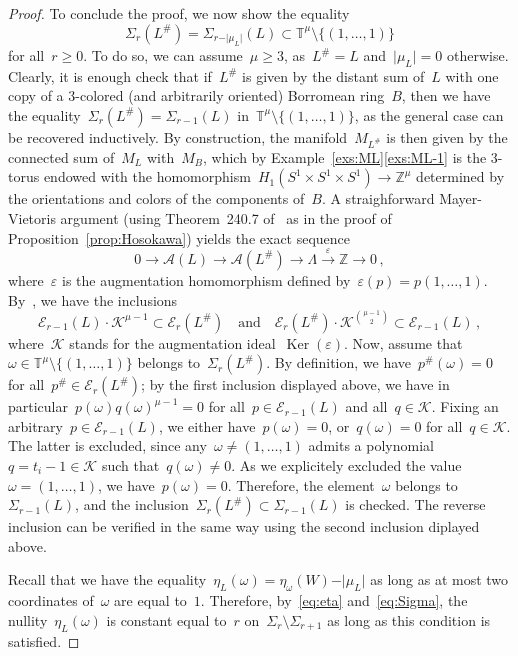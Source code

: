 \documentclass{amsart}
\newcommand{\Z}{\mathbb{Z}}
\newcommand{\K}{\mathcal{K}}
\newcommand{\T}{\mathbb{T}}
\newcommand{\A}{\mathcal{A}}
\newcommand{\Ker}{\operatorname{Ker}}
\theoremstyle{definition}
\theoremstyle{remark}
\begin{document}
\begin{proof}
		To conclude the proof, we now show the equality
	\begin{equation}
	\label{eq:Sigma}
	\Sigma_r(L^\#)=\Sigma_{r-\vert\mu_L\vert}(L)\subset\T^\mu\setminus\{(1,\dots,1)\}
	\end{equation}
	for all~$r\ge 0$.
	To do so, we can assume~$\mu\ge 3$, as~$L^\#=L$ and~$\vert\mu_L\vert=0$ otherwise. Clearly, it is enough check that if~$L^\#$ is given by the distant sum of~$L$ with one copy of a $3$-colored (and arbitrarily oriented) Borromean ring~$B$,
	then we have the equality~$\Sigma_r(L^\#)=\Sigma_{r-1}(L)$ in~$\T^\mu\setminus\{(1,\dots,1)\}$, as the general case
	can be recovered inductively. By construction,
	the manifold~$M_{L^\#}$ is then given by the connected sum of~$M_L$ with~$M_{B}$, which by Example~\ref{exs:ML}\ref{exs:ML-1} is the $3$-torus endowed with the homomorphism~$H_1(S^1\times S^1\times S^1)\to\Z^\mu$
	determined by the orientations and colors of the components of~$B$. A straighforward Mayer-Vietoris argument (using Theorem~240.7 of~\cite{Friedl} as in the proof of Proposition~\ref{prop:Hosokawa}) yields the exact sequence
	\[
	0\longrightarrow\A(L)\longrightarrow\A(L^\#)\longrightarrow\Lambda\stackrel{\varepsilon}{\longrightarrow}\Z\longrightarrow 0\,,
	\]
	where~$\varepsilon$ is the augmentation homomorphism defined by~$\varepsilon(p)=p(1,\dots,1)$.
	By~\cite{Tra82}, we have the inclusions
	\[
	\mathcal{E}_{r-1}(L)\cdot \mathcal{K}^{\mu-1}\subset \mathcal{E}_r(L^\#)\quad\text{and}\quad\mathcal{E}_r(L^\#)\cdot \mathcal{K}^{{\mu-1}\choose{2}}\subset\mathcal{E}_{r-1}(L)\,,
	\]
	where~$\mathcal{K}$ stands for the augmentation ideal~$\Ker(\varepsilon)$. Now, assume that~$\omega\in\T^\mu\setminus\{(1,\dots,1)\}$ belongs to~$\Sigma_r(L^\#)$. By definition, we have~$p^\#(\omega)=0$ for
	all~$p^\#\in\mathcal{E}_r(L^\#)$; by the first inclusion displayed above, we have in particular~$p(\omega)q(\omega)^{\mu-1}=0$ for all~$p\in\mathcal{E}_{r-1}(L)$ and all~$q\in\mathcal{K}$.
	Fixing an arbitrary~$p\in\mathcal{E}_{r-1}(L)$, we either have~$p(\omega)=0$, or~$q(\omega)=0$ for all~$q\in\K$.
	The latter is excluded, since any~$\omega\neq (1,\dots,1)$ admits a polynomial~$q=t_i-1\in\K$ such that~$q(\omega)\neq 0$. As we explicitely excluded the value~$\omega=(1,\dots,1)$, we have~$p(\omega)=0$. Therefore, the element~$\omega$ belongs to~$\Sigma_{r-1}(L)$, and the inclusion~$\Sigma_r(L^\#)\subset\Sigma_{r-1}(L)$ is checked. The reverse inclusion can be verified in the same way using the second inclusion diplayed above.
	
		Recall that we have the equality~$\eta_L(\omega)=\eta_\omega(W)-\vert\mu_L\vert$ as long as at most two coordinates of~$\omega$ are equal to~$1$. Therefore, by~\eqref{eq:eta} and~\eqref{eq:Sigma}, the nullity~$\eta_L(\omega)$ is constant equal to~$r$ on~$\Sigma_r\setminus\Sigma_{r+1}$ as long as this condition is satisfied.
	

\end{proof}
\end{document}
